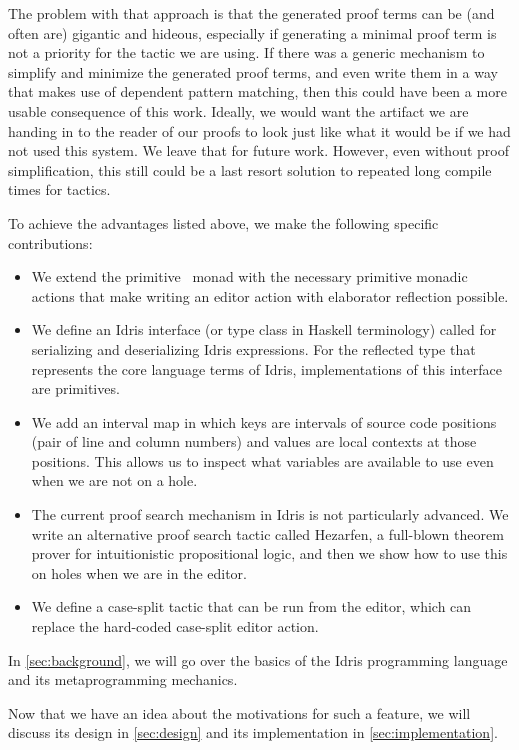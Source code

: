 The problem with that approach is that the generated proof terms can be (and
often are) gigantic and hideous, especially if generating a minimal proof term
is not a priority for the tactic we are using.
If there was a generic mechanism to simplify and minimize the generated proof
terms, and even write them in a way that makes use of dependent pattern
matching, then this could have been a more usable consequence of this work.
Ideally, we would want the artifact we are handing in to the reader of our
proofs to look just like what it would be if we had not used this system.
We leave that for future work.  However, even without proof simplification,
this still could be a last resort solution to repeated long compile times for
tactics.

To achieve the advantages listed above, we make the following specific contributions:
\vspace{-1em}
\begin{itemize}
\item We extend the primitive \Elab\ monad with the necessary primitive monadic
actions that make writing an editor action with elaborator reflection possible.
\item We define an Idris interface (or type class in Haskell terminology)
called  for serializing and deserializing Idris expressions.
For the reflected type that represents the core language terms of Idris,
implementations of this interface are primitives.
\item We add an interval map in which keys are intervals of source code
  positions (pair of line and column numbers) and values are local contexts at
    those positions. This allows us to inspect what variables are available to
    use even when we are not on a hole.
\item The current proof search mechanism in Idris is not particularly advanced.
We write an alternative proof search tactic called Hezarfen, a full-blown
theorem prover for intuitionistic propositional logic, and then we show how
to use this on holes when we are in the editor.
\item We define a case-split tactic that can be run from the editor, which can
replace the hard-coded case-split editor action.
\end{itemize}

In \autoref{sec:background}, we will go over the basics of the Idris
programming language and its metaprogramming mechanics.

Now that we have an idea about the motivations for such a feature, we will
discuss its design in \autoref{sec:design} and its implementation in
\autoref{sec:implementation}.


